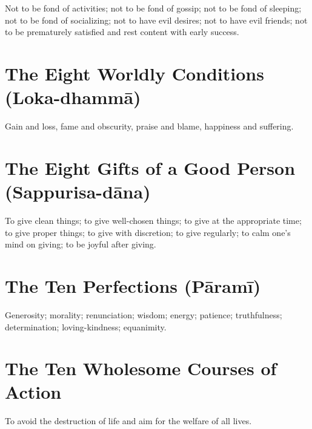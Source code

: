 Not to be fond of activities;
not to be fond of gossip;
not to be fond of sleeping;
not to be fond of socializing;
not to have evil desires;
not to have evil friends;
not to be prematurely satisfied and rest content with early success.


\ifhandbookedition
\vspace*{-\baselineskip}
\fi

\section*{The Eight Worldly Conditions (Loka-dhammā)}

Gain and loss, fame and obscurity, praise and blame, happiness and suffering.


\ifhandbookedition
\vspace*{-\baselineskip}
\fi

\section*{The Eight Gifts of a Good Person (Sappurisa-dāna)}

To give clean things; to give well-chosen things; to give at the appropriate
time; to give proper things; to give with discretion; to give regularly; to calm
one's mind on giving; to be joyful after giving.


\ifhandbookedition
\vspace*{-\baselineskip}
\fi

\section*{The Ten Perfections (Pāramī)}

Generosity; morality; renunciation; wisdom; energy; patience; truthfulness;
determination; loving-kindness; equanimity.


\ifhandbookedition
\vspace*{-\baselineskip}
\fi

\section*{The Ten Wholesome Courses of Action}

To avoid the destruction of life and aim for the welfare of all lives.

